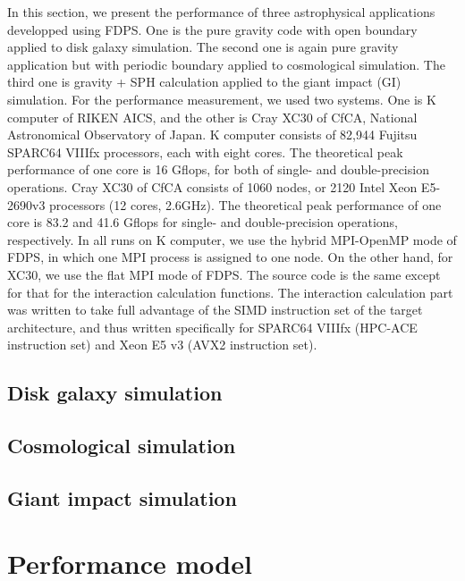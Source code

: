 \documentclass[proof]{pasj01}
\begin{document}
In this section, we present the performance of three astrophysical
applications developped using FDPS. One is the pure gravity code with
open boundary applied to disk galaxy simulation. The second one is
again pure gravity application but with periodic boundary applied to
cosmological simulation. The third one is gravity + SPH calculation
applied to the giant impact (GI) simulation.  For the performance
measurement, we used two systems. One is K computer of RIKEN AICS, and
the other is Cray XC30 of CfCA, National Astronomical Observatory of
Japan. K computer consists of 82,944 Fujitsu SPARC64 VIIIfx
processors, each with eight cores. The theoretical peak performance of
one core is 16 Gflops, for both of single- and double-precision
operations. Cray XC30 of CfCA consists of 1060 nodes, or 2120 Intel
Xeon E5-2690v3 processors (12 cores, 2.6GHz). The theoretical peak
performance of one core is 83.2 and 41.6 Gflops for single- and
double-precision operations, respectively.  In all runs on K computer,
we use the hybrid MPI-OpenMP mode of FDPS, in which one MPI process is
assigned to one node. On the other hand, for XC30, we use the flat MPI
mode of FDPS. The source code is the same except for that for the
interaction calculation functions. The interaction calculation part
was written to take full advantage of the SIMD instruction set of the
target architecture, and thus written specifically for SPARC64 VIIIfx
(HPC-ACE instruction set) and Xeon E5 v3 (AVX2 instruction set).

\label{sec:measuredperformance}
\subsection{Disk galaxy simulation}
\label{sec:diskgalaxy}


\subsection{Cosmological simulation}



\subsection{Giant impact simulation}

\label{sec:sph}




\section{Performance model}
\label{sec:performancemodel}
\end{document}
